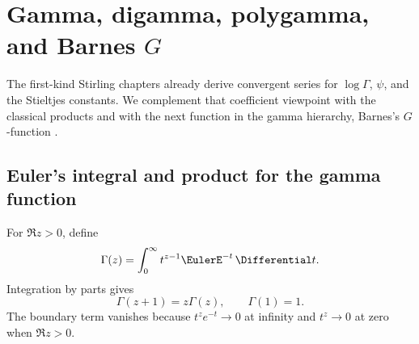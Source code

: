 \documentclass[11pt,a4paper,oneside,openany]{book}
\theoremstyle{definition}
\theoremstyle{remark}
\begin{document}
\chapter{Gamma, digamma, polygamma, and Barnes \texorpdfstring{$G$}{G}}
\label{ch:ext-gamma-barnes}

The first-kind Stirling chapters already derive convergent series for
\(\log\Gamma\), \(\psi\), and the Stieltjes constants.  We complement that
coefficient viewpoint with the classical products and with the next function in
the gamma hierarchy, Barnes's \(G\)-function \cite{NISTDLMF,WhittakerWatson1927}.

\section{Euler's integral and product for the gamma function}

For \(\Re z>0\), define
\begin{equation}\label{eq:ext-gamma-integral}
 \Gamma(z)=\int_0^\infty t^{z-1}\EulerE^{-t}\,\Differential t.
\end{equation}
Integration by parts gives
\begin{equation}\label{eq:ext-gamma-recurrence}
 \Gamma(z+1)=z\Gamma(z),\qquad \Gamma(1)=1.
\end{equation}
The boundary term vanishes because \(t^ze^{-t}\to0\) at infinity and
\(t^z\to0\) at zero when \(\Re z>0\).
\end{document}
